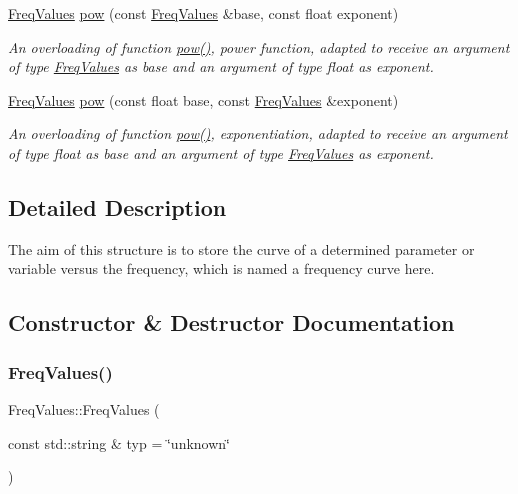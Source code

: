 \begin{DoxyCompactItemize}
\hyperlink{structFreqValues}{Freq\+Values} \hyperlink{structFreqValues_a8b8ee90b9d108ad7008a3613b31253e7}{pow} (const \hyperlink{structFreqValues}{Freq\+Values} \&base, const float exponent)
\begin{DoxyCompactList}\small\item\em An overloading of function {\ttfamily \hyperlink{structFreqValues_a8b8ee90b9d108ad7008a3613b31253e7}{pow()}}, power function, adapted to receive an argument of type {\itshape \hyperlink{structFreqValues}{Freq\+Values}} as base and an argument of type {\itshape float} as exponent. \end{DoxyCompactList}\item 
\hyperlink{structFreqValues}{Freq\+Values} \hyperlink{structFreqValues_a4a50ddd9aa3d48c0b3da456ca07551a5}{pow} (const float base, const \hyperlink{structFreqValues}{Freq\+Values} \&exponent)
\begin{DoxyCompactList}\small\item\em An overloading of function {\ttfamily \hyperlink{structFreqValues_a8b8ee90b9d108ad7008a3613b31253e7}{pow()}}, exponentiation, adapted to receive an argument of type {\itshape float} as base and an argument of type {\itshape \hyperlink{structFreqValues}{Freq\+Values}} as exponent. \end{DoxyCompactList}\end{DoxyCompactItemize}


\subsection{Detailed Description}
The aim of this structure is to store the curve of a determined parameter or variable versus the frequency, which is named a frequency curve here. 

\subsection{Constructor \& Destructor Documentation}
\mbox{\label{structFreqValues_ab2ff89efb4571a8f6748017c6191d81e}} 
\subsubsection{\texorpdfstring{Freq\+Values()}{FreqValues()}\hspace{0.1cm}{\footnotesize\ttfamily [1/2]}}
{\footnotesize\ttfamily Freq\+Values\+::\+Freq\+Values (\begin{DoxyParamCaption}\item[{const std\+::string \&}]{typ = {\ttfamily \char`\"{}unknown\char`\"{}} }\end{DoxyParamCaption})\hspace{0.3cm}{\ttfamily [inline]}}



